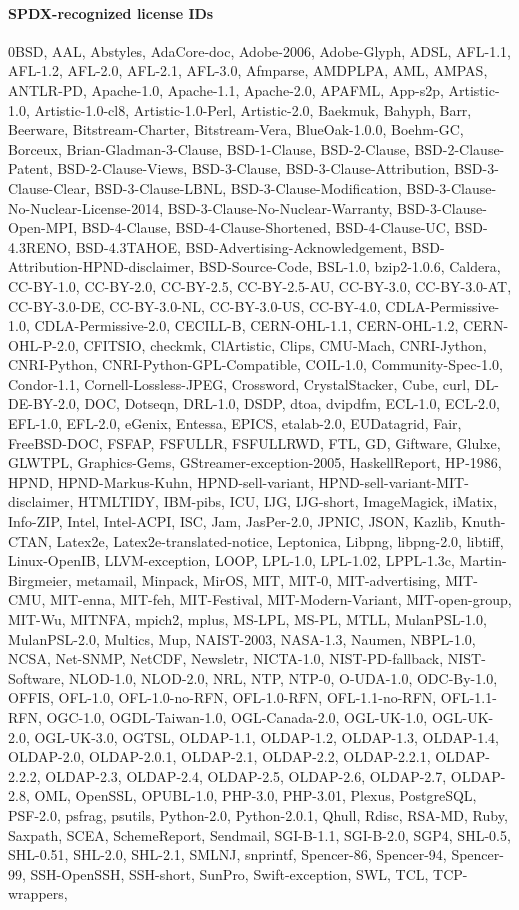 \documentclass[10pt]{article} %
\begin{document}
\paragraph{SPDX-recognized license IDs}
0BSD, AAL, Abstyles, AdaCore-doc, Adobe-2006, Adobe-Glyph, ADSL, AFL-1.1, AFL-1.2, AFL-2.0, AFL-2.1, AFL-3.0, Afmparse, AMDPLPA, AML, AMPAS, ANTLR-PD, Apache-1.0, Apache-1.1, Apache-2.0, APAFML, App-s2p, Artistic-1.0, Artistic-1.0-cl8, Artistic-1.0-Perl, Artistic-2.0, Baekmuk, Bahyph, Barr, Beerware, Bitstream-Charter, Bitstream-Vera, BlueOak-1.0.0, Boehm-GC, Borceux, Brian-Gladman-3-Clause, BSD-1-Clause, BSD-2-Clause, BSD-2-Clause-Patent, BSD-2-Clause-Views, BSD-3-Clause, BSD-3-Clause-Attribution, BSD-3-Clause-Clear, BSD-3-Clause-LBNL, BSD-3-Clause-Modification, BSD-3-Clause-No-Nuclear-License-2014, BSD-3-Clause-No-Nuclear-Warranty, BSD-3-Clause-Open-MPI, BSD-4-Clause, BSD-4-Clause-Shortened, BSD-4-Clause-UC, BSD-4.3RENO, BSD-4.3TAHOE, BSD-Advertising-Acknowledgement, BSD-Attribution-HPND-disclaimer, BSD-Source-Code, BSL-1.0, bzip2-1.0.6, Caldera, CC-BY-1.0, CC-BY-2.0, CC-BY-2.5, CC-BY-2.5-AU, CC-BY-3.0, CC-BY-3.0-AT, CC-BY-3.0-DE, CC-BY-3.0-NL, CC-BY-3.0-US, CC-BY-4.0, CDLA-Permissive-1.0, CDLA-Permissive-2.0, CECILL-B, CERN-OHL-1.1, CERN-OHL-1.2, CERN-OHL-P-2.0, CFITSIO, checkmk, ClArtistic, Clips, CMU-Mach, CNRI-Jython, CNRI-Python, CNRI-Python-GPL-Compatible, COIL-1.0, Community-Spec-1.0, Condor-1.1, Cornell-Lossless-JPEG, Crossword, CrystalStacker, Cube, curl, DL-DE-BY-2.0, DOC, Dotseqn, DRL-1.0, DSDP, dtoa, dvipdfm, ECL-1.0, ECL-2.0, EFL-1.0, EFL-2.0, eGenix, Entessa, EPICS, etalab-2.0, EUDatagrid, Fair, FreeBSD-DOC, FSFAP, FSFULLR, FSFULLRWD, FTL, GD, Giftware, Glulxe, GLWTPL, Graphics-Gems, GStreamer-exception-2005, HaskellReport, HP-1986, HPND, HPND-Markus-Kuhn, HPND-sell-variant, HPND-sell-variant-MIT-disclaimer, HTMLTIDY, IBM-pibs, ICU, IJG, IJG-short, ImageMagick, iMatix, Info-ZIP, Intel, Intel-ACPI, ISC, Jam, JasPer-2.0, JPNIC, JSON, Kazlib, Knuth-CTAN, Latex2e, Latex2e-translated-notice, Leptonica, Libpng, libpng-2.0, libtiff, Linux-OpenIB, LLVM-exception, LOOP, LPL-1.0, LPL-1.02, LPPL-1.3c, Martin-Birgmeier, metamail, Minpack, MirOS, MIT, MIT-0, MIT-advertising, MIT-CMU, MIT-enna, MIT-feh, MIT-Festival, MIT-Modern-Variant, MIT-open-group, MIT-Wu, MITNFA, mpich2, mplus, MS-LPL, MS-PL, MTLL, MulanPSL-1.0, MulanPSL-2.0, Multics, Mup, NAIST-2003, NASA-1.3, Naumen, NBPL-1.0, NCSA, Net-SNMP, NetCDF, Newsletr, NICTA-1.0, NIST-PD-fallback, NIST-Software, NLOD-1.0, NLOD-2.0, NRL, NTP, NTP-0, O-UDA-1.0, ODC-By-1.0, OFFIS, OFL-1.0, OFL-1.0-no-RFN, OFL-1.0-RFN, OFL-1.1-no-RFN, OFL-1.1-RFN, OGC-1.0, OGDL-Taiwan-1.0, OGL-Canada-2.0, OGL-UK-1.0, OGL-UK-2.0, OGL-UK-3.0, OGTSL, OLDAP-1.1, OLDAP-1.2, OLDAP-1.3, OLDAP-1.4, OLDAP-2.0, OLDAP-2.0.1, OLDAP-2.1, OLDAP-2.2, OLDAP-2.2.1, OLDAP-2.2.2, OLDAP-2.3, OLDAP-2.4, OLDAP-2.5, OLDAP-2.6, OLDAP-2.7, OLDAP-2.8, OML, OpenSSL, OPUBL-1.0, PHP-3.0, PHP-3.01, Plexus, PostgreSQL, PSF-2.0, psfrag, psutils, Python-2.0, Python-2.0.1, Qhull, Rdisc, RSA-MD, Ruby, Saxpath, SCEA, SchemeReport, Sendmail, SGI-B-1.1, SGI-B-2.0, SGP4, SHL-0.5, SHL-0.51, SHL-2.0, SHL-2.1, SMLNJ, snprintf, Spencer-86, Spencer-94, Spencer-99, SSH-OpenSSH, SSH-short, SunPro, Swift-exception, SWL, TCL, TCP-wrappers, 
\end{document}
